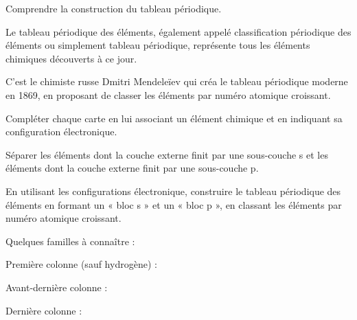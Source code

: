 \teteSndAtom



\begin{objectifs}
  \item Comprendre la construction du tableau périodique.
\end{objectifs}

\begin{contexte}
  Le tableau périodique des éléments, également appelé classification périodique des éléments ou simplement tableau périodique, représente tous les éléments chimiques découverts à ce jour.
  
 C'est le chimiste russe Dmitri Mendeleïev qui créa le tableau périodique moderne en 1869, en proposant de classer les éléments par numéro atomique croissant.

\end{contexte}


\mesure
Compléter chaque carte en lui associant un élément chimique et en indiquant sa configuration électronique.

\mesure
Séparer les éléments dont la couche externe finit par une sous-couche s et les éléments dont la couche externe finit par une sous-couche p.

\mesure
En utilisant les configurations électronique, construire le tableau périodique des éléments en formant un « bloc s » et un « bloc p », en classant les éléments par numéro atomique croissant.




\begin{importants}
  Quelques familles à connaître : 
  \begin{listePoints}
    \item Première colonne (sauf hydrogène) : 
    \item Avant-dernière colonne : 
    \item Dernière colonne : 
  \end{listePoints}
\end{importants}

